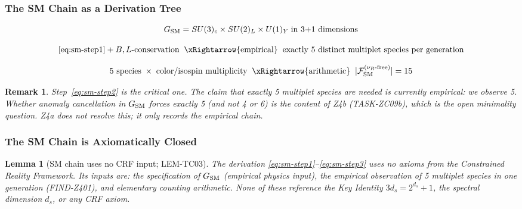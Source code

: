 \documentclass[12pt, a4paper]{article}
\newtheorem{lemma}{Lemma}[section]
\newtheorem{remark}{Remark}[section]
\begin{document}
\subsubsection{The SM Chain as a Derivation Tree}

\begin{formalbox}[title={SM derivation chain (EQ-TC03)}]
\begin{equation}
  G_{\rm SM} = SU(3)_c \times SU(2)_L \times U(1)_Y
  \;\text{in 3+1 dimensions}
  \label{eq:sm-step1}
\end{equation}

\begin{equation}
  \eqref{eq:sm-step1} + B,L\text{-conservation}
  \;\;\xRightarrow{\rm empirical}\;\;
  \text{exactly 5 distinct multiplet species per generation}
  \label{eq:sm-step2}
\end{equation}

\begin{equation}
  \text{5 species} \;\times\; \text{color/isospin multiplicity}
  \;\;\xRightarrow{\rm arithmetic}\;\;
  |\mathcal{F}_{\rm SM}^{(\nu_R\text{-free})}| = 15
  \label{eq:sm-step3}
\end{equation}
\end{formalbox}

\begin{remark}
Step~\eqref{eq:sm-step2} is the critical one. The claim that exactly
5 multiplet species are needed is currently empirical: we observe 5.
Whether anomaly cancellation in $G_{\rm SM}$ \emph{forces} exactly
5 (and not 4 or 6) is the content of Z4b (TASK-ZC09b), which is
the open minimality question. Z4a does not resolve this; it only
records the empirical chain.
\end{remark}

\subsubsection{The SM Chain is Axiomatically Closed}

\begin{lemma}[SM chain uses no CRF input; LEM-TC03]
\label{lem:sm-closed}
The derivation \eqref{eq:sm-step1}--\eqref{eq:sm-step3} uses no
axioms from the Constrained Reality Framework. Its inputs are:
the specification of $G_{\rm SM}$ (empirical physics input), the
empirical observation of 5 multiplet species in one generation
(FIND-Z401), and elementary counting arithmetic.
None of these reference the Key Identity $3d_s = 2^{d_s}+1$,
the spectral dimension $d_s$, or any CRF axiom.
\end{lemma}
\end{document}
